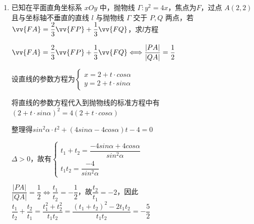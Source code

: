 \begin{enumerate}
\begin{jieda}
\begin{enumerate}
            $\dfrac{(t_1+t_2)^2 - 2t_1t_2}{t_1t_2} = \dfrac{(t_1+t_2)^2}{t_1t_2} - 2 = \dfrac{\left(-\dfrac{3sin\alpha + cos\alpha}{2sin^2\alpha + 1}\right)^2}{\left(-\dfrac{2}{2sin^2\alpha + 1}\right)} - 2 = -\dfrac{(3sin\alpha + cos\alpha)^2}{2(2sin^2\alpha + 1)} - 2 = -\dfrac{5}{2}$

            故$-\dfrac{(3sin\alpha + cos\alpha)^2}{2(2sin^2\alpha + 1)} = -\dfrac{1}{2}$，即$(2sin^2\alpha + 1) = (3sin\alpha + cos\alpha)^2$，即$2sin^2\alpha + 1 = 8sin^2\alpha + 6sin\alpha cos\alpha + 1$，故$6sin^2\alpha + 6sin\alpha cos\alpha = 0$，即$k^2+k = 0$，解得$k = -1$或$0$（舍），因此直线方程为$y = 1-x$.
        \end{enumerate}
    \end{jieda}
    
    \begin{vspace_}
    \vsp[6]
    \end{vspace_}
    \item 已知在平面直角坐标系 ${xOy}$ 中，抛物线 $\Gamma : y^2 = 4x$，焦点为$F$，过点 $A(2,2)$ 且与坐标轴不垂直的直线 $l$ 与抛物线 $\Gamma$ 交于 $P,Q$ 两点，若 $\vv{FA} = \dfrac{2}{3}\vv{FP} + \dfrac{1}{3}\vv{FQ}$，求$l$方程
    \begin{jieda}
        $\vv{FA} = \dfrac{2}{3}\vv{FP} + \dfrac{1}{3}\vv{FQ} \Longleftrightarrow \dfrac{|PA|}{|QA|} = \dfrac{1}{2}$

            设直线的参数方程为$\left\{\begin{array}{l}
                 x = 2 + t \cdot cos\alpha \\
                 y = 2 + t \cdot sin\alpha
            \end{array}\right.$

            将直线的参数方程代入到抛物线的标准方程中有$\left(2 + t \cdot sin\alpha\right)^2 = 4(2 + t \cdot cos\alpha)$

            整理得$sin^2\alpha \cdot t^2 + (4sin\alpha-4cos\alpha)t - 4 = 0$

            $\Delta > 0$，故有$\left\{\begin{array}{l}
                 t_1+t_2 = \dfrac{-4sin\alpha + 4cos\alpha}{sin^2\alpha} \\
                 t_1t_2 = \dfrac{-4}{sin^2\alpha}
            \end{array}\right.$

            $\dfrac{|PA|}{|QA|} = \dfrac{1}{2} \Longleftrightarrow \dfrac{t_1}{t_2} = -\dfrac{1}{2}$，故$\dfrac{t_2}{t_1} = -2$，因此$\dfrac{t_1}{t_2} + \dfrac{t_2}{t_1} = \dfrac{t_1^2+t_2^2}{t_1t_2} = \dfrac{(t_1+t_2)^2 - 2t_1t_2}{t_1t_2} = -\dfrac{5}{2}$


\end{jieda}
\end{enumerate}

